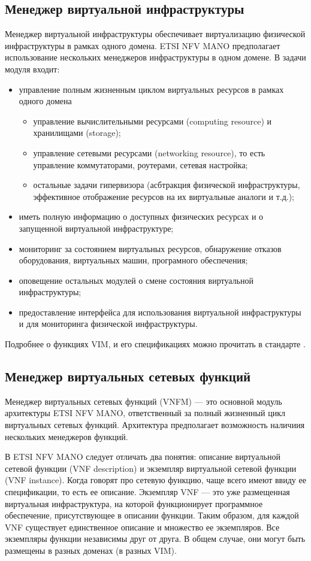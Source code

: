 \documentclass[oneside,final,14pt,a4paper]{extreport}
\begin{document}
\subsection{Менеджер виртуальной инфраструктуры}
Менеджер виртуальной инфраструктуры обеспечивает виртуализацию физической инфраструктуры в рамках одного домена. ETSI NFV MANO предполагает использование нескольких менеджеров инфраструктуры в одном домене. В задачи модуля входит:

\begin{itemize}
	\item управление полным жизненным циклом виртуальных ресурсов в рамках одного домена
	\begin{itemize}
		\item управление вычислительными ресурсами (computing resource) и хранилищами (storage);
		\item управление сетевыми ресурсами (networking resource), то есть управление коммутаторами, роутерами, сетевая настройка;
		\item остальные задачи гипервизора (асбтракция физической инфраструктуры, эффективное отображение ресурсов на их виртуальные аналоги и т.д.);
	\end{itemize}
	\item иметь полную информацию о доступных физических ресурсах и о запущенной виртуальной инфраструктуре;
	\item мониторинг за состоянием виртуальных ресурсов, обнаружение отказов оборудования, виртуальных машин, програмного обеспечения;
	\item оповещение остальных модулей о смене состояния виртуальной инфраструктуры;
	\item предоставление интерфейса для использования виртуальной инфраструктуры и для мониторинга физической инфраструктуры.
\end{itemize}

Подробнее о функциях VIM, и его спецификациях можно прочитать в стандарте \cite{nfv-mano-official-2016-04}.

\subsection{Менеджер виртуальных сетевых функций}
Менеджер виртуальных сетевых функций (VNFM) --- это основной модуль архитектуры ETSI NFV MANO, ответственный за  полный жизненный цикл виртуальных сетевых функций. Архитектура предполагает возможность наличиия нескольких менеджеров функций.

В ETSI NFV MANO следует отличать два понятия: описание виртуальной сетевой функции (VNF description) и экземпляр виртуальной сетевой функции (VNF instance). Когда говорят про сетевую функцию, чаще всего имеют ввиду ее спецификации, то есть ее описание. Экземпляр VNF --- это уже размещенная виртуальная инфраструктура, на которой функционирует программное обеспечение, присутствующее в описании функции. Таким образом, для каждой VNF существует единственное описание и множество ее экземпляров. Все экземпляры функции независимы друг от друга. В общем случае, они могут быть размещены в разных доменах (в разных VIM).
\end{document}

